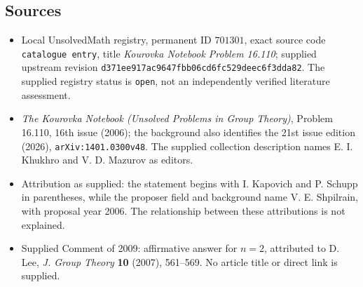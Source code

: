 \documentclass[11pt]{article}
\begin{document}
\subsection{Sources}
\begin{itemize}
\item Local UnsolvedMath registry, permanent ID \(701301\), exact source code \texttt{catalogue entry}, title \emph{Kourovka Notebook Problem 16.110}; supplied upstream revision \texttt{d371ee917ac9647fbb06cd6fc529deec6f3dda82}. The supplied registry status is \texttt{open}, not an independently verified literature assessment.
\item \emph{The Kourovka Notebook (Unsolved Problems in Group Theory)}, Problem 16.110, 16th issue (2006); the background also identifies the 21st issue edition (2026), \texttt{arXiv:1401.0300v48}. The supplied collection description names E. I. Khukhro and V. D. Mazurov as editors.
\item Attribution as supplied: the statement begins with I. Kapovich and P. Schupp in parentheses, while the proposer field and background name V. E. Shpilrain, with proposal year 2006. The relationship between these attributions is not explained.
\item Supplied Comment of 2009: affirmative answer for \(n=2\), attributed to D. Lee, \emph{J. Group Theory} \textbf{10} (2007), 561--569. No article title or direct link is supplied.
\end{itemize}
\end{document}
